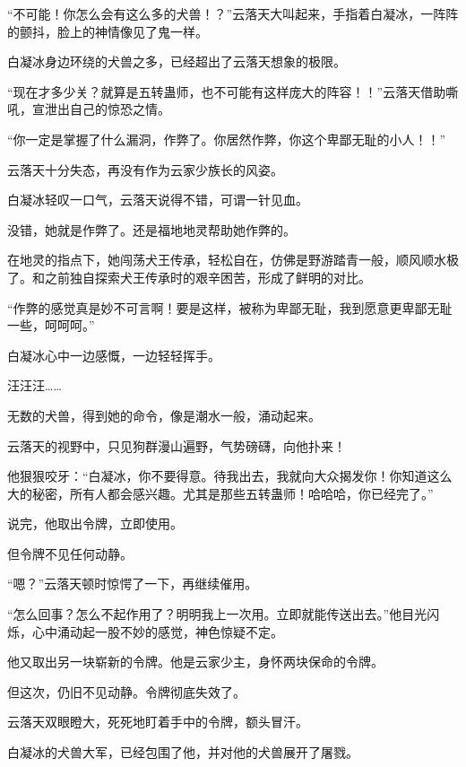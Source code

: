 
\begin{this_body}



“不可能！你怎么会有这么多的犬兽！？”云落天大叫起来，手指着白凝冰，一阵阵的颤抖，脸上的神情像见了鬼一样。

白凝冰身边环绕的犬兽之多，已经超出了云落天想象的极限。

“现在才多少关？就算是五转蛊师，也不可能有这样庞大的阵容！！”云落天借助嘶吼，宣泄出自己的惊恐之情。

“你一定是掌握了什么漏洞，作弊了。你居然作弊，你这个卑鄙无耻的小人！！”

云落天十分失态，再没有作为云家少族长的风姿。

白凝冰轻叹一口气，云落天说得不错，可谓一针见血。

没错，她就是作弊了。还是福地地灵帮助她作弊的。

在地灵的指点下，她闯荡犬王传承，轻松自在，仿佛是野游踏青一般，顺风顺水极了。和之前独自探索犬王传承时的艰辛困苦，形成了鲜明的对比。

“作弊的感觉真是妙不可言啊！要是这样，被称为卑鄙无耻，我到愿意更卑鄙无耻一些，呵呵呵。”

白凝冰心中一边感慨，一边轻轻挥手。

汪汪汪……

无数的犬兽，得到她的命令，像是潮水一般，涌动起来。

云落天的视野中，只见狗群漫山遍野，气势磅礴，向他扑来！

他狠狠咬牙：“白凝冰，你不要得意。待我出去，我就向大众揭发你！你知道这么大的秘密，所有人都会感兴趣。尤其是那些五转蛊师！哈哈哈，你已经完了。”

说完，他取出令牌，立即使用。

但令牌不见任何动静。

“嗯？”云落天顿时惊愕了一下，再继续催用。

“怎么回事？怎么不起作用了？明明我上一次用。立即就能传送出去。”他目光闪烁，心中涌动起一股不妙的感觉，神色惊疑不定。

他又取出另一块崭新的令牌。他是云家少主，身怀两块保命的令牌。

但这次，仍旧不见动静。令牌彻底失效了。

云落天双眼瞪大，死死地盯着手中的令牌，额头冒汗。

白凝冰的犬兽大军，已经包围了他，并对他的犬兽展开了屠戮。


\end{this_body}

